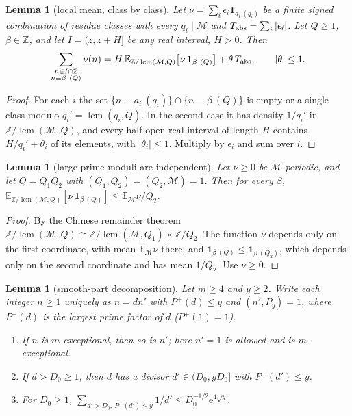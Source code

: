 \documentclass[10pt,reqno]{amsart}
\newtheorem{lemma}[theorem]{Lemma}
\theoremstyle{definition}
\newcommand{\Z}{\mathbb Z}
\newcommand{\M}{\mathcal M}
\newcommand{\E}{\mathbb E}
\newcommand{\ind}{\mathbf 1}
\newcommand{\lcm}{\operatorname{lcm}}
\newcommand{\e}{\mathrm e}
\newcommand{\Tabs}{T_{\rm abs}}
\begin{document}
\begin{lemma}[local mean, class by class]\label{lem:localmean}
Let $\nu=\sum_i\epsilon_i\ind_{a_i\ (q_i)}$ be a finite signed combination
of residue classes with every $q_i\mid\M$ and $\Tabs=\sum_i|\epsilon_i|$.
Let $Q\geq1$, $\beta\in\Z$, and let $I=(z,z+H]$ be any real interval,
$H>0$.  Then
\[
 \sum_{\substack{n\in I\cap\Z\\n\equiv\beta\ (Q)}}\nu(n)
 =H\,\E_{\Z/\lcm(\M,Q)}\bigl[\nu\,\ind_{\beta\ (Q)}\bigr]+\theta\,\Tabs,
 \qquad|\theta|\leq1.
\]
\end{lemma}

\begin{proof}
For each $i$ the set $\{n\equiv a_i\ (q_i)\}\cap\{n\equiv\beta\ (Q)\}$ is
empty or a single class modulo $q_i'=\lcm(q_i,Q)$.  In the second case
it has density $1/q_i'$ in $\Z/\lcm(\M,Q)$, and every half-open real
interval of length $H$ contains $H/q_i'+\theta_i$ of its elements, with
$|\theta_i|\leq1$.  Multiply by $\epsilon_i$ and sum over $i$.
\end{proof}

\begin{lemma}[large-prime moduli are independent]\label{lem:indep}
Let $\nu\geq0$ be $\M$-periodic, and let $Q=Q_1Q_2$ with
$(Q_1,Q_2)=(Q_2,\M)=1$.  Then for every $\beta$,
$\E_{\Z/\lcm(\M,Q)}[\nu\,\ind_{\beta\ (Q)}]\leq\E_{\M}\nu/Q_2$.
\end{lemma}

\begin{proof}
By the Chinese remainder theorem
$\Z/\lcm(\M,Q)\cong\Z/\lcm(\M,Q_1)\times\Z/Q_2$.  The function $\nu$
depends only on the first coordinate, with mean $\E_{\M}\nu$ there, and
$\ind_{\beta\ (Q)}\leq\ind_{\beta\ (Q_2)}$, which depends only on the
second coordinate and has mean $1/Q_2$.  Use $\nu\geq0$.
\end{proof}

\begin{lemma}[smooth-part decomposition]\label{lem:smooth}
Let $m\geq4$ and $y\geq2$.  Write each integer $n\geq1$ uniquely as
$n=dn'$ with $P^+(d)\leq y$ and $(n',P_y)=1$, where $P^+(d)$ is the
largest prime factor of $d$ \textup{(}$P^+(1)=1$\textup{)}.
\begin{enumerate}
\item[(a)] If $n$ is $m$-exceptional, then so is $n'$; here $n'=1$ is
allowed and is $m$-exceptional.
\item[(b)] If $d>D_0\geq1$, then $d$ has a divisor
$d'\in(D_0,yD_0]$ with $P^+(d')\leq y$.
\item[(c)] For $D_0\geq1$,
$\sum_{d'>D_0,\ P^+(d')\leq y}1/d'\leq D_0^{-1/2}\e^{4\sqrt y}$.
\end{enumerate}
\end{lemma}
\end{document}
